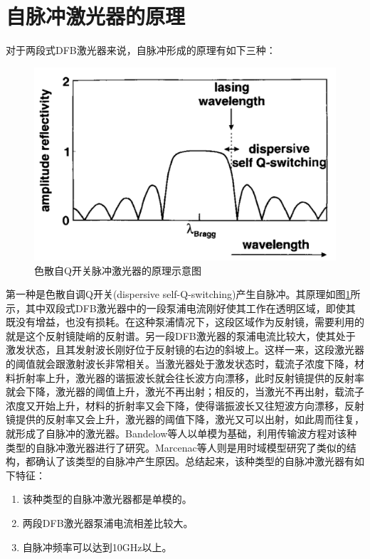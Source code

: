 \section{自脉冲激光器的原理}
对于两段式DFB激光器来说，自脉冲形成的原理有如下三种\cite{sartorius1997dispersive}：

\begin{figure}[htb]
	\centering
	\includegraphics[width=12cm]{./Pictures/laser_selfQswitching.jpg}
	\captionsetup{justification=centering}
	\caption{色散自Q开关脉冲激光器的原理示意图\cite{sartorius1997dispersive}}
	\label{laser_selfQswitching}
\end{figure}

第一种是色散自调Q开关(dispersive self-Q-switching)产生自脉冲。其原理如图\ref{laser_selfQswitching}所示，其中双段式DFB激光器中的一段泵浦电流刚好使其工作在透明区域，即使其既没有增益，也没有损耗。在这种泵浦情况下，这段区域作为反射镜，需要利用的就是这个反射镜陡峭的反射谱。另一段DFB激光器的泵浦电流比较大，使其处于激发状态，且其发射波长刚好位于反射镜的右边的斜坡上。这样一来，这段激光器的阈值就会跟激射波长非常相关。当激光器处于激发状态时，载流子浓度下降，材料折射率上升，激光器的谐振波长就会往长波方向漂移，此时反射镜提供的反射率就会下降，激光器的阈值上升，激光不再出射；相反的，当激光不再出射，载流子浓度又开始上升，材料的折射率又会下降，使得谐振波长又往短波方向漂移，反射镜提供的反射率又会上升，激光器的阈值下降，激光又可以出射，如此周而往复，就形成了自脉冲的激光器。Bandelow等人\cite{bandelow1993theory}以单模为基础，利用传输波方程对该种类型的自脉冲激光器进行了研究。Marcenac等人\cite{marcenac1994distinction}则是用时域模型研究了类似的结构，都确认了该类型的自脉冲产生原因。总结起来，该种类型的自脉冲激光器有如下特征：

\begin{enumerate}
	\item 
	该种类型的自脉冲激光器都是单模的。
	\item 
	两段DFB激光器泵浦电流相差比较大。
	\item 
	自脉冲频率可以达到10GHz以上。
\end{enumerate}

